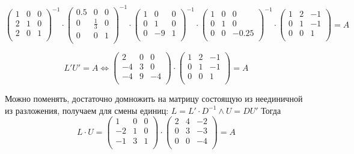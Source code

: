 \documentclass[a4paper,12pt]{article}
\begin{document}
\[
\begin{pmatrix}
    1& 0& 0 \\
    2& 1& 0 \\
    2& 0& 1 \\
\end{pmatrix}^{-1} \cdot 
\begin{pmatrix}
    0.5& 0& 0 \\
    0& \frac{1}{3}& 0 \\
    0& 0& 1 \\ 
\end{pmatrix}^{-1} \cdot 
\begin{pmatrix}
    1 & 0 & 0 \\
    0 & 1 & 0 \\
    0 & -9 & 1 \\
\end{pmatrix}^{-1} \cdot
\begin{pmatrix}
    1 & 0 & 0 \\
    0 & 1 & 0 \\
    0 & 0 & -0.25 \\
\end{pmatrix}^{-1} \cdot\begin{pmatrix}
    1& 2& -1 \\
    0& 1& -1 \\
    0& 0& 1 \\
\end{pmatrix}= A
\]

\[
L'U' = A \Longleftrightarrow
\begin{pmatrix}
    2 & 0 & 0 \\
    -4 & 3 & 0 \\
    -4 & 9 & -4 \\
\end{pmatrix} \cdot \begin{pmatrix}
    1& 2& -1 \\
    0& 1& -1 \\
    0& 0& 1 \\
\end{pmatrix} = A
\]

Можно поменять, достаточно домножить на матрицу состоящую из неединичной из разложения, получаем для смены единиц: $L=L'\cdot D^{-1}\land U = D U'$
 Тогда 
\[
  L \cdot U = \begin{pmatrix}
   1 & 0 & 0 \\
   -2 & 1 & 0 \\
   -1 & 3 & 1 \\
   \end{pmatrix}
   \cdot
   \begin{pmatrix}
   2 & 4 & -2 \\
   0 & 3 & -3 \\
   0 & 0 & -4 \\
   \end{pmatrix} = A
\]
\end{document}
